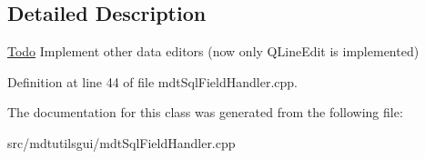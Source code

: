 \subsection{Detailed Description}
\begin{Desc}
\item[\hyperlink{todo__todo000059}{Todo}]Implement other data editors (now only QLineEdit is implemented) \end{Desc}


Definition at line 44 of file mdtSqlFieldHandler.cpp.



The documentation for this class was generated from the following file:\begin{DoxyCompactItemize}
\item 
src/mdtutilsgui/mdtSqlFieldHandler.cpp\end{DoxyCompactItemize}
